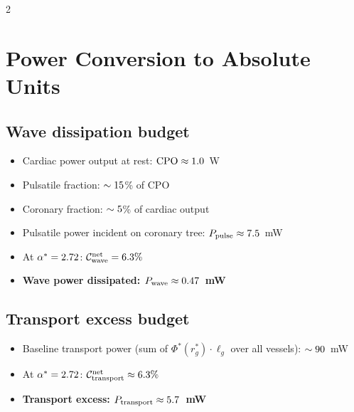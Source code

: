 \documentclass[11pt,a4paper]{article}
\begin{document}
\begin{multicols}{2}

\section{Power Conversion to Absolute Units}
\label{sec:power}

\subsection{Wave dissipation budget}

\begin{itemize}
\item Cardiac power output at rest: $\mathrm{CPO} \approx 1.0$~W
\item Pulsatile fraction: $\sim15$\% of CPO
\item Coronary fraction: $\sim5$\% of cardiac output
\item Pulsatile power incident on coronary tree: $P_{\mathrm{pulse}} \approx 7.5$~mW
\item At $\alpha^* = 2.72$: $\mathcal{C}^{\mathrm{net}}_{\mathrm{wave}} = 6.3\%$
\item \textbf{Wave power dissipated: $P_{\mathrm{wave}} \approx 0.47$~mW}
\end{itemize}

\subsection{Transport excess budget}

\begin{itemize}
\item Baseline transport power (sum of $\Phi^*(r^*_g)\cdot\ell_g$ over all vessels): $\sim90$~mW
\item At $\alpha^* = 2.72$: $\mathcal{C}_\mathrm{transport}^\mathrm{net} \approx 6.3\%$
\item \textbf{Transport excess: $P_{\mathrm{transport}} \approx 5.7$~mW}
\end{itemize}


\end{multicols}
\end{document}
